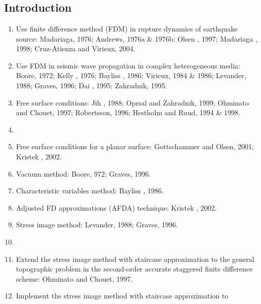 \renewcommand{\pmk}{ZhangW\_2006\_GJI\_Traction image method}
\renewcommand{\prf}{WaveForward/\pmk.pdf}
\renewcommand{\pti}{Traction image method for irregular free surface boundaries
in finite difference seismic wave simulation}
\renewcommand{\pay}{Wei Zhang, Xiaofei Chen, 2006}
\renewcommand{\pjo}{Geophys. J. Int.}
\renewcommand{\pda}{2016/10/29 Sat.}

\section{\pinfo}
\subsection{Introduction}
\begin{enumerate}[\hspace{10mm}*]
  \item Use finite difference method (FDM) in rupture dynamics of
    earthquake source: Madariaga, 1976; Andrews, 1976a \& 1976b;
    Olsen \etal, 1997; Madariaga \etal, 1998; Cruz-Atienza and Virieux, 2004.
  \item Use FDM in seismic wave propagation in complex heterogeneous media:
    Boore, 1972; Kelly \etal, 1976; Bayliss \etal, 1986; Virieux, 1984 \& 1986;
    Levander, 1988; Graves, 1996; Dai \etal, 1995; Zahradnik, 1995.
  \item Free surface conditions: Jih \etal, 1988; Oprsal and Zahradnik, 1999;
    Ohminato and Chouet, 1997; Robertsson, 1996; Hestholm and Ruud, 1994 \& 1998.
  \item \sline
  \item Free surface conditions for a planar surface:
    Gottschammer and Olsen, 2001; Kristek \etal, 2002.
  \item Vacuum method: Boore, 972; Graves, 1996.
  \item Characteristic variables method: Bayliss \etal, 1986.
  \item Adjusted FD approximations (AFDA) technique: Kristek \etal, 2002.
  \item Stress image method: Levander, 1988; Graves, 1996.
  \item \sline
  \item Extend the stress image method with staircase approximation to
    the general topographic problem in the second-order accurate
    staggered finite difference scheme: Ohminato and Chouet, 1997.
  \item Implement the stress image method with staircase approximation to

\end{enumerate}

